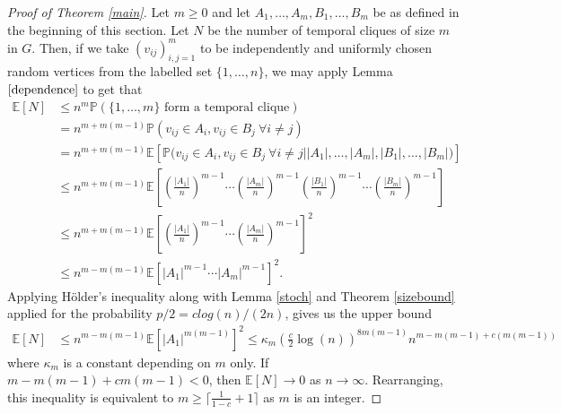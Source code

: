 \documentclass[11pt]{article}
\newcommand{\1}{\mathbf{1}} %
\newcommand{\prob}{\mathbb{P}} %
\newcommand{\ex}{\mathbb{E}} %
\begin{document}
\begin{proof}[Proof of Theorem \ref{main}]
Let $m \geq 0$ and let $A_1,\ldots,A_m,B_1,\ldots,B_m$ be as defined in the beginning of this section. Let $N$ be the number of temporal cliques of size $m$ in $G$. Then, if we take $(v_{ij})_{i,j = 1}^m$ to be independently and uniformly chosen random vertices from the labelled set $\{1,\ldots,n\}$, we may apply Lemma $\ref{dependence}$ to get that
\begin{align*}
\ex[N] &\leq n^m\prob(\{1,\ldots,m\} \text{ form a temporal clique}) \\
&= n^{m+m(m-1)}\prob(v_{ij} \in A_i, v_{ij} \in B_j \ \forall i \ne j) \\
&= n^{m+m(m-1)}\ex\left[ \prob\Big(v_{ij} \in A_i, v_{ij} \in B_j \ \forall i \ne j \Big| |A_1|,\ldots,|A_m|,|B_1|,\ldots,|B_m| \Big)  \right] \\
&\leq n^{m+m(m-1)}\ex\left[ \left( \frac{|A_1|}{n} \right)^{m-1} \cdots \left( \frac{|A_m|}{n} \right)^{m-1} \left( \frac{|B_1|}{n} \right)^{m-1} \cdots \left( \frac{|B_m|}{n} \right)^{m-1} \right] \\
&\leq n^{m+m(m-1)}\ex\left[ \left( \frac{|A_1|}{n} \right)^{m-1} \cdots \left( \frac{|A_m|}{n} \right)^{m-1}\right]^2 \\
&\leq n^{m-m(m-1)}\ex[|A_1|^{m-1} \cdots |A_m|^{m-1}]^2.
\end{align*}
Applying H\"{o}lder's inequality along with Lemma \ref{stoch} and
Theorem \ref{sizebound}
  applied for the probability $p/2 = c log(n)/(2n)$,
gives us the upper bound 
\begin{align*}
  \ex[N]
  &
    \leq n^{m-m(m-1)}\ex[|A_1|^{m(m-1)}]^2 \leq
         \kappa_m \left(\frac{c}{2}\log(n)\right)^{8m(m-1)}n^{m-m(m-1)+c(m(m-1))}
\end{align*}
  where $\kappa_m$ is a constant depending on $m$ only.
If $m-m(m-1)+cm(m-1) < 0$, then $\ex[N] \to 0$ as $n \to \infty$. Rearranging, this inequality is equivalent to $m \geq \lceil \frac{1}{1-c}+1\rceil$ as $m$ is an integer.
\end{proof}





	
\end{document}
